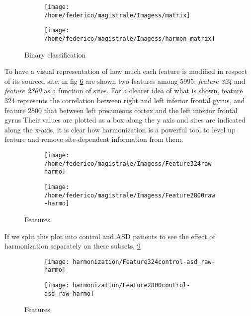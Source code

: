 \documentclass[a4paper,11pt]{article}
\begin{document}
\begin{figure}
\centering
\begin{subfigure}[b]{0.8\textwidth}
   \texttt{[image: /home/federico/magistrale/Imagess/matrix]}
   \caption{}
   \label{fig:heatmap_harmonization_harmon}
\end{subfigure}

\begin{subfigure}[b]{0.8\textwidth}
   \texttt{[image: /home/federico/magistrale/Imagess/harmon\_matrix]}
   \caption{}
   \label{fig:heatmap_harmonization_noharmon}
\end{subfigure}

\caption{Binary classification}
\label{fig:heatmap_harmonization}
\end{figure}

To have a visual representation of how much each feature is modified in respect of its sourced site, in fig \ref{fig:features_raw-harmo} are shown two features among 5995: \emph{feature 324} and \emph{feature 2800} as a function of sites.
For a clearer idea of what is shown, feature 324 represents the correlation between right and left inferior frontal gyrus, and feature 2800 that between left precuneous cortex and the left inferior frontal gyrus
Their values are plotted as a box along the y axis and sites are indicated along the x-axis, it is clear how harmonization is a powerful tool to level up feature and remove site-dependent information from them.

\begin{figure}
\centering
\begin{subfigure}[b]{1.\textwidth}
   \texttt{[image: /home/federico/magistrale/Imagess/Feature324raw-harmo]}
   \caption{}
   \label{fig:feature324}
\end{subfigure}
\begin{subfigure}[b]{1.\textwidth}
   \texttt{[image: /home/federico/magistrale/Imagess/Feature2800raw-harmo]}
   \caption{}
   \label{fig:feature2800}
\end{subfigure}
\caption{Features}
\label{fig:features_raw-harmo}
\end{figure}

 If we split this plot into control and ASD patients to see the effect of harmonization separately on these subsets, \ref{fig:features_control-asd_raw-harmo}

 \begin{figure}
 \centering
 \begin{subfigure}[b]{1.\textwidth}
    \texttt{[image: harmonization/Feature324control-asd\_raw-harmo]}
    \caption{}
    \label{fig:feature324-control-asd}
 \end{subfigure}
 \begin{subfigure}[b]{1.\textwidth}
    \texttt{[image: harmonization/Feature2800control-asd\_raw-harmo]}
    \caption{}
    \label{fig:feature2800control-asd}
 \end{subfigure}
 \caption{Features}
 \label{fig:features_control-asd_raw-harmo}
 \end{figure}
\end{document}
